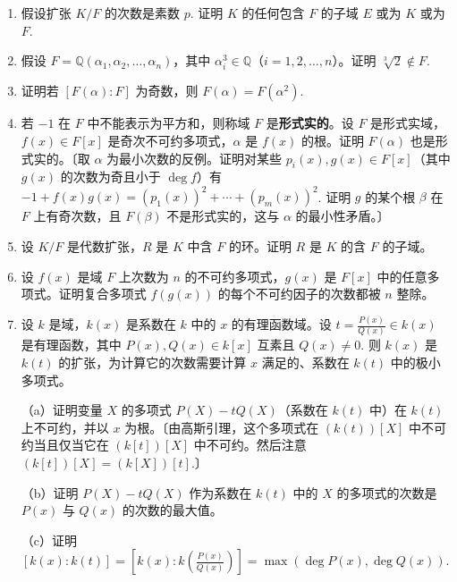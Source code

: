 \begin{enumerate}
（b）确定扩张 \(\mathbb{Q}(\sqrt{1+\sqrt{-3}}+\sqrt{1-\sqrt{-3}})\) 在 \(\mathbb{Q}\) 上的次数。

\item 假设扩张 \(K/F\) 的次数是素数 \(p\). 证明 \(K\) 的任何包含 \(F\) 的子域 \(E\) 或为 \(K\) 或为 \(F\).

\item 假设 \(F = \mathbb{Q}(\alpha_1, \alpha_2, \ldots, \alpha_n)\)，其中 \(\alpha_i^3 \in \mathbb{Q}\)（\(i = 1, 2, \ldots, n\)）。证明 \(\sqrt[3]{2} \notin F\).

\item 证明若 \([F(\alpha):F]\) 为奇数，则 \(F(\alpha) = F(\alpha^2)\).

\item 若 \(-1\) 在 \(F\) 中不能表示为平方和，则称域 \(F\) 是\textbf{形式实的}。设 \(F\) 是形式实域，\(f(x) \in F[x]\) 是奇次不可约多项式，\(\alpha\) 是 \(f(x)\) 的根。证明 \(F(\alpha)\) 也是形式实的。〔取 \(\alpha\) 为最小次数的反例。证明对某些 \(p_i(x), g(x) \in F[x]\)（其中 \(g(x)\) 的次数为奇且小于 \(\deg f\)）有 \(-1+f(x)g(x) = (p_1(x))^2+\cdots+(p_m(x))^2\). 证明 \(g\) 的某个根 \(\beta\) 在 \(F\) 上有奇次数，且 \(F(\beta)\) 不是形式实的，这与 \(\alpha\) 的最小性矛盾。〕

\item 设 \(K/F\) 是代数扩张，\(R\) 是 \(K\) 中含 \(F\) 的环。证明 \(R\) 是 \(K\) 的含 \(F\) 的子域。

\item 设 \(f(x)\) 是域 \(F\) 上次数为 \(n\) 的不可约多项式，\(g(x)\) 是 \(F[x]\) 中的任意多项式。证明复合多项式 \(f(g(x))\) 的每个不可约因子的次数都被 \(n\) 整除。

\item 设 \(k\) 是域，\(k(x)\) 是系数在 \(k\) 中的 \(x\) 的有理函数域。设 \(t = \frac{P(x)}{Q(x)} \in k(x)\) 是有理函数，其中 \(P(x), Q(x) \in k[x]\) 互素且 \(Q(x) \neq 0\). 则 \(k(x)\) 是 \(k(t)\) 的扩张，为计算它的次数需要计算 \(x\) 满足的、系数在 \(k(t)\) 中的极小多项式。

（a）证明变量 \(X\) 的多项式 \(P(X)-tQ(X)\)（系数在 \(k(t)\) 中）在 \(k(t)\) 上不可约，并以 \(x\) 为根。〔由高斯引理，这个多项式在 \((k(t))[X]\) 中不可约当且仅当它在 \((k[t])[X]\) 中不可约。然后注意 \((k[t])[X] = (k[X])[t]\).〕

（b）证明 \(P(X)-tQ(X)\) 作为系数在 \(k(t)\) 中的 \(X\) 的多项式的次数是 \(P(x)\) 与 \(Q(x)\) 的次数的最大值。

（c）证明 \([k(x):k(t)] = [k(x):k(\frac{P(x)}{Q(x)})] = \max(\deg P(x), \deg Q(x))\).


\end{enumerate}
